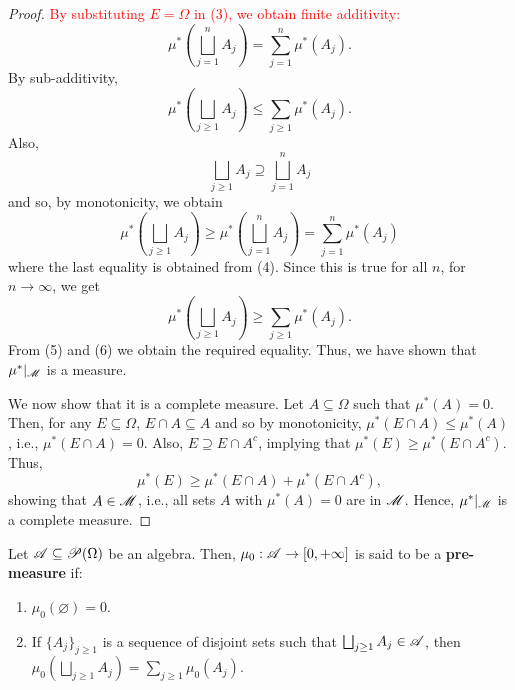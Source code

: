 \begin{proof}
    \textcolor{red}{By substituting $E = \Omega$ in (3), we obtain finite additivity:}
    \begin{equation}
        \mu^*\left( \bigsqcup_{j = 1}^n A_j \right) = \sum_{j = 1}^{n} \mu^*(A_j).    
    \end{equation}
    By sub-additivity,
    \begin{equation}
        \mu^* \left(\bigsqcup_{j \geq 1} A_j \right) \leq \sum_{j \geq 1} \mu^* (A_j).
    \end{equation}
    Also, 
    \[ \bigsqcup_{j \geq 1} A_j \supseteq \bigsqcup_{j = 1}^n A_j \]
    and so, by monotonicity, we obtain
    \[ \mu^*\left( \bigsqcup_{j \geq 1} A_j \right) \geq \mu^* \left( \bigsqcup_{j = 1}^n A_j \right) = \sum_{j = 1}^n \mu^*(A_j) \]
    where the last equality is obtained from (4). Since this is true for all $n$, for $n \to \infty$, we get
    \begin{equation}
       \mu^*\left( \bigsqcup_{j \geq 1} A_j \right) \geq \sum_{j \geq 1} \mu^*(A_j).
    \end{equation}
    From (5) and (6) we obtain the required equality. Thus, we have shown that $\mu^*|_{\mathscr{M}}$ is a measure. 
    
    We now show that it is a complete measure. Let $A \subseteq \Omega$ such that $\mu^*(A) = 0$. Then, for any $E \subseteq \Omega$, $E \cap A \subseteq A$ and so by monotonicity, $\mu^*(E \cap A) \leq \mu^*(A)$, i.e., $\mu^*(E \cap A) = 0$. Also, $E \supseteq E \cap A^c$, implying that $\mu^*(E) \geq \mu^*(E \cap A^c)$. Thus, 
    \[ \mu^*(E) \geq \mu^*(E \cap A) + \mu^*(E \cap A^c), \]
    showing that $A \in \mathscr{M}$, i.e., all sets $A$ with $\mu^*(A) = 0$ are in $\mathscr{M}$. Hence, $\mu^*|_{\mathscr{M}}$ is a complete measure. 
\end{proof}


\begin{definition}
    Let $\mathscr{A} \subseteq \mathscr{P}(\Omega)$ be an algebra. Then, $\mu_0: \mathscr{A} \to [0, +\infty]$ is said to be a \textbf{pre-measure} if:
    \begin{enumerate}
        \item $\mu_0(\varnothing) = 0$.
        \item If $\{ A_j \}_{j \geq 1}$ is a sequence of disjoint sets such that $\bigsqcup_{j \geq 1} A_j \in \mathscr{A}$, then $\mu_0 \left( \bigsqcup_{j \geq 1} A_j \right) = \sum_{j \geq 1} \mu_0(A_j)$.
    \end{enumerate}
\end{definition}


